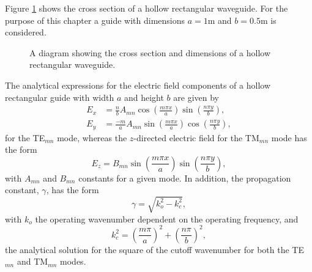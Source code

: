 Figure \ref{lezar:fig:hollow_rectangular_guide} shows the cross section of a
hollow rectangular waveguide. For the purpose of this chapter a guide
with dimensions $a = 1\text{m}$ and $b = 0.5\text{m}$ is considered.
\begin{figure}[ht]
    \centering
    \caption{A diagram showing the cross section and dimensions of a hollow rectangular waveguide.}
    \label{lezar:fig:hollow_rectangular_guide}
\end{figure}
The analytical expressions for the electric field components of a
hollow rectangular guide with width $a$ and height $b$ are given
by~\cite{Pozar2005}
\begin{align}
    \label{lezar:eqn:rect:E_x analytical}
    E_x &= \frac{n}{b}A_{mn}\cos\left(\frac{m\pi
    x}{a}\right)\sin\left(\frac{n\pi y}{b}\right),\\
    \label{lezar:eqn:rect:E_y analytical}
    E_y &= \frac{-m}{a}A_{mn}\sin\left(\frac{m\pi x}{a}\right)\cos\left(\frac{n\pi y}{b}\right),
\end{align}
for the TE$_{mn}$ mode, whereas the $z$-directed electric field for the TM$_{mn}$ mode has the form~\cite{Pozar2005}
\begin{equation}
 \label{lezar:eqn:rect_E_z_analytical}
 E_z = B_{mn}\sin\left(\frac{m\pi x}{a}\right)\sin\left(\frac{n\pi y}{b}\right),
\end{equation}
with $A_{mn}$ and $B_{mn}$ constants for a given mode.
In addition, the propagation constant, $\gamma$, has the form
\begin{equation}
 \label{lezar:eqn:rectangular_propagation}
 \gamma = \sqrt{k_o^2 - k_c^2},
\end{equation}
with $k_o$ the operating wavenumber dependent on the operating frequency, and
\begin{equation}
 \label{lezar:eqn:rectangular_cutoff}
 k_c^2 = \left(\frac{m\pi}{a}\right)^2 + \left(\frac{n\pi}{b}\right)^2,
\end{equation}
the analytical solution for the square of the cutoff wavenumber for both the TE$_{mn}$ and TM$_{mn}$ modes.

